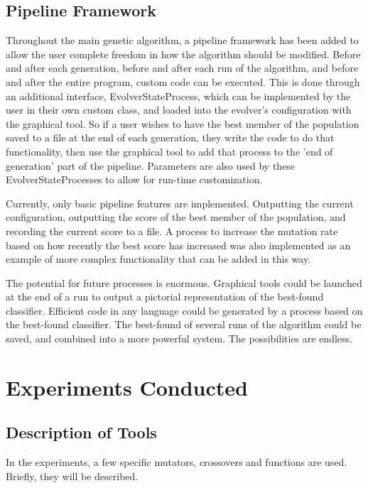\documentclass[a4paper,11pt]{report}
\begin{document}
\section{Pipeline Framework}
Throughout the main genetic algorithm, a pipeline framework has been added to allow the user complete freedom in 
how the algorithm should be modified. Before and after each generation, before and after each run of the algorithm, 
and before and after the entire program, custom code can be executed. This is done through an additional interface, 
EvolverStateProcess, which can be implemented by the user in their own custom class, and loaded into the evolver's
configuration with the graphical tool. So if a user wishes to have the best member of the population saved to a file 
at the end of each generation, they write the code to do that functionality, then use the graphical tool to 
add that process to the 'end of generation' part of the pipeline. Parameters are also used by these EvolverStateProcesses
to allow for run-time customization. 

Currently, only basic pipeline features are implemented. Outputting the current configuration, outputting the 
score of the best member of the population, and recording the current score to a file. A process to increase the 
mutation rate based on how recently the best score has increased was also implemented as an example of more complex
functionality that can be added in this way. 

The potential for future processes is enormous. Graphical tools could be launched at the end of a run to output a 
pictorial representation of the best-found classifier. Efficient code in any language could be generated by a 
process based on the best-found classifier. The best-found of several runs of the algorithm could be saved, and 
combined into a more powerful system. The possibilities are endless.

\chapter{Experiments Conducted}

\section{Description of Tools}

In the experiments, a few specific mutators, crossovers and functions are used. Briefly, they will 
be described. 
\end{document}

